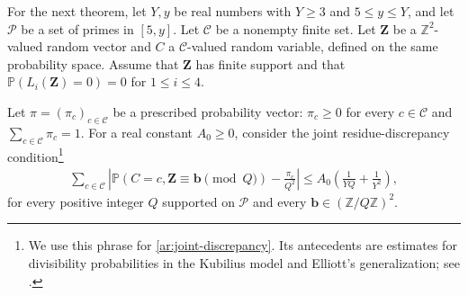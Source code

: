\documentclass[twoside]{aomart}
\theoremstyle{paperplain}
\theoremstyle{paperdefinition}
\newcommand{\Z}{\mathbb Z}
\newcommand{\Pp}{\mathbb P}
\numberwithin{equation}{section}
\begin{document}
For the next theorem, let $Y,y$ be real numbers with
$Y\ge3$ and $5\le y\le Y$, and let $\mathcal P$ be a set
of primes in $[5,y]$.
Let $\mathcal C$ be a nonempty finite set.
Let $\mathbf Z$ be a $\Z^2$-valued random vector and
$C$ a $\mathcal C$-valued random variable, defined on the same
probability space.
Assume that $\mathbf Z$ has finite support and that
$\Pp(L_i(\mathbf Z)=0)=0$ for $1\le i\le4$.

Let $\pi=(\pi_c)_{c\in\mathcal C}$ be a prescribed probability
vector: $\pi_c\ge0$ for every $c\in\mathcal C$ and
$\displaystyle \sum_{c\in\mathcal C}\pi_c=1$.
For a real constant $A_0\ge0$, consider the joint
residue-discrepancy condition\footnote{We use this phrase for
\eqref{ar:joint-discrepancy}. Its antecedents are estimates for
divisibility probabilities in the Kubilius model and Elliott's
generalization; see \cite[Sections~1.1--1.2, pp.~1--2]{Gorodetsky}.}
\begin{equation}
 \begin{split}
 \sum_{c\in\mathcal C}\left|
 \Pp(C=c,\mathbf Z\equiv\mathbf b\pmod Q)-\frac{\pi_c}{Q^2}
 \right|
 \le A_0\left(\frac1{YQ}+\frac1{Y^2}\right),
 \end{split}
 \label{ar:joint-discrepancy}
\end{equation}
for every positive integer $Q$ supported on $\mathcal P$ and every
$\mathbf b\in(\Z/Q\Z)^2$.
\end{document}
